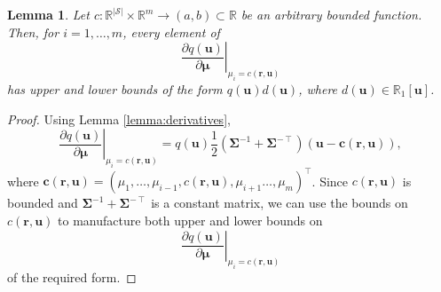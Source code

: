 \documentclass{article}
\newtheorem{lemma}[theorem]{Lemma}
\theoremstyle{definition}
\theoremstyle{remark}
\begin{document}
\begin{lemma} \label{lemma:bound2}
  Let $c : \mathbb{R}^{|\mathcal{S}|} \times \mathbb{R}^m \to (a, b) \subset
  \mathbb{R}$ be an arbitrary bounded function. Then, for $i = 1, \dots, m$,
  every element of
  \[
    \left. \frac{\partial q(\mathbf{u})}{\partial \bm\mu} \right|_{\mu_i =
      c(\mathbf{r}, \mathbf{u})}
  \]
  has upper and lower bounds of the form $q(\mathbf{u})d(\mathbf{u})$,
  where $d(\mathbf{u}) \in \mathbb{R}_1[\mathbf{u}]$.
\end{lemma}
\begin{proof}
  Using Lemma \ref{lemma:derivatives},
  \[
    \left. \frac{\partial q(\mathbf{u})}{\partial \bm\mu} \right|_{\mu_i =
      c(\mathbf{r}, \mathbf{u})} = q(\mathbf{u})\frac{1}{2}(\bm\Sigma^{-1} +
    \bm\Sigma^{-\intercal})(\mathbf{u} - \mathbf{c}(\mathbf{r}, \mathbf{u})),
  \]
  where $\mathbf{c}(\mathbf{r}, \mathbf{u}) = (\mu_1, \dots, \mu_{i - 1},
  c(\mathbf{r}, \mathbf{u}), \mu_{i + 1} \dots, \mu_m)^\intercal$. Since
  $c(\mathbf{r}, \mathbf{u})$ is bounded and $\bm\Sigma^{-1} +
  \bm\Sigma^{-\intercal}$ is a constant matrix, we can use the bounds on
  $c(\mathbf{r}, \mathbf{u})$ to manufacture both upper and lower bounds on
  \[
     \left. \frac{\partial q(\mathbf{u})}{\partial \bm\mu} \right|_{\mu_i =
      c(\mathbf{r}, \mathbf{u})}
  \]
  of the required form.
\end{proof}
\end{document}
